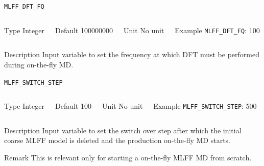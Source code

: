 \begin{frame}[allowframebreaks]{\texttt{{MLFF\_DFT\_FQ}}} \label{MLFF_DFT_FQ}
\vspace*{-12pt}
\begin{columns}
\begin{block}{Type}
Integer
\end{block}

\begin{block}{Default}
100000000
\end{block}

\begin{block}{Unit}
No unit
\end{block}

\begin{block}{Example}
\texttt{MLFF\_DFT\_FQ}: 100
\end{block}
\end{columns}

\begin{block}{Description}
Input variable to set the frequency at which DFT must be performed during on-the-fly MD.
\end{block}

\end{frame}

\begin{frame}[allowframebreaks]{\texttt{{MLFF\_SWITCH\_STEP}}} \label{MLFF_SWITCH_STEP}
\vspace*{-12pt}
\begin{columns}
\begin{block}{Type}
Integer
\end{block}

\begin{block}{Default}
100
\end{block}

\begin{block}{Unit}
No unit
\end{block}

\begin{block}{Example}
\texttt{MLFF\_SWITCH\_STEP}: 500
\end{block}
\end{columns}

\begin{block}{Description}
Input variable to set the switch over step after which the initial coarse MLFF model is deleted and the production on-the-fly MD starts.
\end{block}

\begin{block}{Remark}
This is relevant only for starting a on-the-fly MLFF MD from scratch.
\end{block}

\end{frame}

